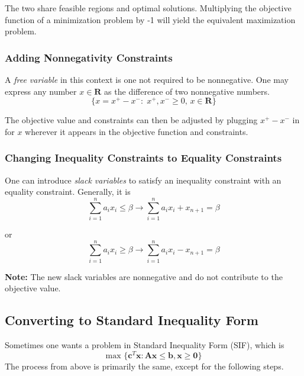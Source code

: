 The two share feasible regions and optimal solutions. Multiplying the objective function of a minimization problem by -1 will yield the equivalent maximization problem.

\subsubsection{Adding Nonnegativity Constraints}
A \emph{free variable} in this context is one not required to be nonnegative. One may express any number $x\in \mathbf{R}$ as the difference of two nonnegative numbers.
\begin{equation*}
    \{x = x^+ - x^- :\; x^+, x^- \geq 0,\, x \in \mathbf{R}\}
\end{equation*}

The objective value and constraints can then be adjusted by plugging $x^+ - x^-$ in for $x$ wherever it appears in the objective function and constraints.

\subsubsection{Changing Inequality Constraints to Equality Constraints}
One can introduce \emph{slack variables} to satisfy an inequality constraint with an equality constraint. Generally, it is
\begin{equation*}
    \sum_{i=1}^n a_i x_i \leq \beta \longrightarrow \sum_{i=1}^n a_i x_i + x_{n+1} = \beta
\end{equation*}

or
\begin{equation*}
    \sum_{i=1}^n a_i x_i \geq \beta \longrightarrow \sum_{i=1}^n a_i x_i - x_{n+1} = \beta
\end{equation*}

\textbf{Note:} The new slack variables are nonnegative and do not contribute to the objective value.


\subsection{Converting to Standard Inequality Form}
Sometimes one wants a problem in Standard Inequality Form (SIF), which is
\begin{equation*}
    \text{max } \{\mathbf{c}^T\mathbf{x} : \mathbf{Ax} \leq \mathbf{b}, \mathbf{x} \geq \mathbf{0} \}
\end{equation*}
The process from above is primarily the same, except for the following steps.

